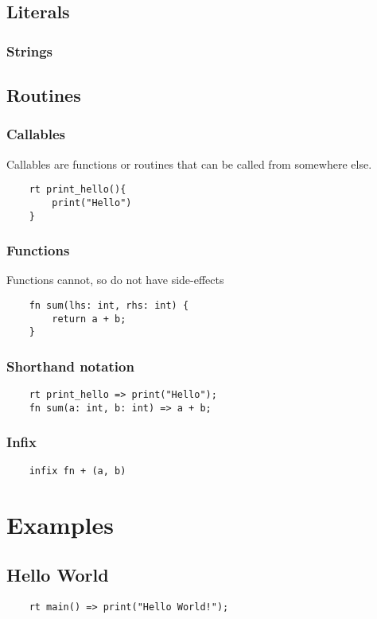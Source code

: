 \documentclass{report}
\begin{document}
\section{Literals}
\subsection {Strings}


\section {Routines}

\subsection {Callables}
Callables are functions or routines that can be called from somewhere else.
\begin{verbatim}
    rt print_hello(){
        print("Hello")
    }

\end{verbatim}
\subsection {Functions}
Functions cannot, so do not have side-effects
\begin{verbatim}
    fn sum(lhs: int, rhs: int) {
        return a + b;
    }

\end{verbatim}

\subsection{Shorthand notation}
\begin{verbatim}
    rt print_hello => print("Hello");
    fn sum(a: int, b: int) => a + b;
\end{verbatim}


\subsection {Infix}
\begin{verbatim}
    infix fn + (a, b)
\end{verbatim}


\chapter{Examples}
\section{Hello World}
\begin{verbatim}
    rt main() => print("Hello World!");
\end{verbatim}
\end{document}

